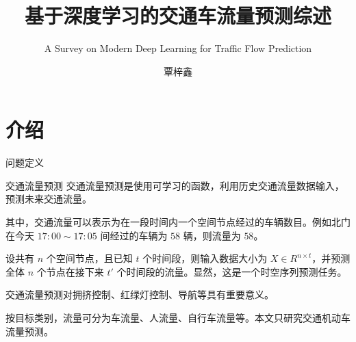 \documentclass{libs/format}
\title[交通流量预测综述]{基于深度学习的交通车流量预测综述}
\subtitle{A Survey on Modern Deep Learning for Traffic Flow Prediction}
\institute[Sun Yat-Sen University]{\normalsize 中山大学人工智能学院}
\date[\ctoday]{\ctoday}
\begin{document}


\author[Zixin Qin]{\large 覃梓鑫}

\begin{frame}
  \titlepage
\end{frame}


\section{介绍}

\begin{frame}{问题定义}
  \begin{block}{交通流量预测}
    交通流量预测是使用可学习的函数，利用历史交通流量数据输入，预测未来交通流量。\cite{T-ZS1}

    其中，交通流量可以表示为在一段时间内一个空间节点经过的车辆数目。例如北门在今天 $17:00\sim17:05$ 间经过的车辆为 $58$ 辆，则流量为 $58$。

    设共有 $n$ 个空间节点，且已知 $t$ 个时间段，则输入数据大小为 $X\in R^{n\times t}$，并预测全体 $n$ 个节点在接下来 $t'$ 个时间段的流量。显然，这是一个时空序列预测任务。

  \end{block}
  交通流量预测对拥挤控制、红绿灯控制、导航等具有重要意义。\cite{T-ZS2, T-ZS32}
  
  按目标类别，流量可分为车流量、人流量、自行车流量等。本文只研究交通机动车流量预测。
\end{frame}
\end{document}
